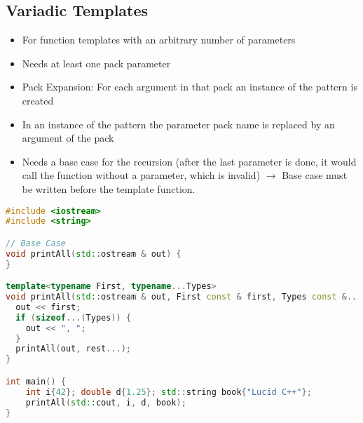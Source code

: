 \subsection{Variadic Templates}
\begin{itemize}
  \itemsep -0.5em 
  \item For function templates with an arbitrary number of parameters
  \item Needs at least one pack parameter
  \item Pack Expansion: For each argument in that pack an instance of the pattern is created
  \item In an instance of the pattern the parameter pack name is replaced by an argument of the pack
  \item Needs a base case for the recursion (after the last parameter is done, it would call the function without a parameter, which is invalid) $\rightarrow$ Base case must be written before the template function.
\end{itemize}
\begin{lstlisting}[language=C++]
#include <iostream>
#include <string>

// Base Case 
void printAll(std::ostream & out) {
}

template<typename First, typename...Types>
void printAll(std::ostream & out, First const & first, Types const &...rest) {
  out << first;
  if (sizeof...(Types)) {
    out << ", ";
  }
  printAll(out, rest...);
}

int main() {
	int i{42}; double d{1.25}; std::string book{"Lucid C++"};
	printAll(std::cout, i, d, book);
}

\end{lstlisting}


\pagebreak